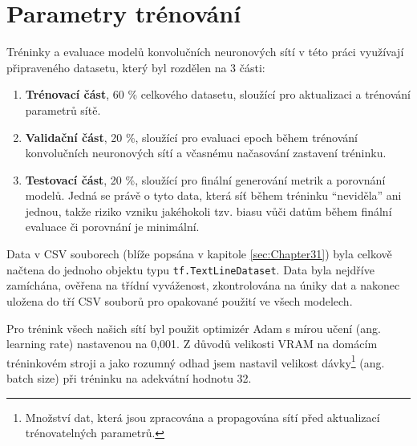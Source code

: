 \section{Parametry trénování}
\label{sec:Chapter53}
Tréninky a evaluace modelů konvolučních neuronových sítí v této práci využívají připraveného datasetu, který byl rozdělen na 3 části:
\begin{enumerate}
    \item \textbf{Trénovací část}, 60 \% celkového datasetu, sloužící pro aktualizaci a trénování parametrů sítě.
    \item \textbf{Validační část}, 20 \%, sloužící pro evaluaci epoch během trénování konvolučních neuronových sítí a včasnému načasování zastavení tréninku.
    \item \textbf{Testovací část}, 20 \%, sloužící pro finální generování metrik a porovnání modelů. Jedná se právě o tyto data, která síť během tréninku \enquote{neviděla} ani jednou, takže riziko vzniku jakéhokoli tzv. biasu vůči datům během finální evaluace či porovnání je minimální.
\end{enumerate}

Data v CSV souborech (blíže popsána v kapitole \ref{sec:Chapter31}) byla celkově načtena do jednoho objektu typu \texttt{tf.TextLineDataset}. Data byla nejdříve zamíchána, ověřena na třídní vyváženost, zkontrolována na úniky dat a nakonec uložena do tří CSV souborů pro opakované použití ve všech modelech.

Pro trénink všech našich sítí byl použit optimizér Adam s mírou učení (ang. learning rate) nastavenou na 0,001. Z důvodů velikosti VRAM na domácím tréninkovém stroji a jako rozumný odhad jsem nastavil velikost dávky\footnote{Množství dat, která jsou zpracována a propagována sítí před aktualizací trénovatelných parametrů.} (ang. batch size) při tréninku na adekvátní hodnotu 32.

\endinput